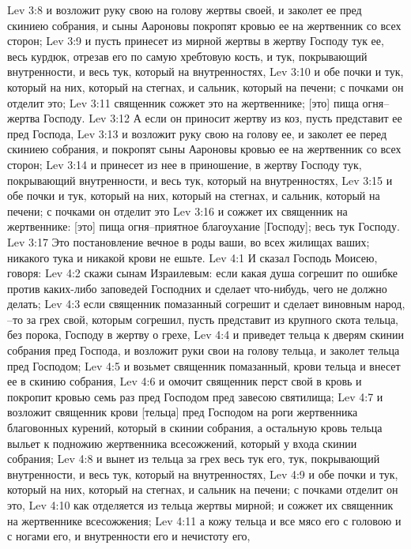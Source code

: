 Lev 3:8  и возложит руку свою на голову жертвы своей, и заколет ее пред скиниею собрания, и сыны Аароновы покропят кровью ее на жертвенник со всех сторон;
Lev 3:9  и пусть принесет из мирной жертвы в жертву Господу тук ее, весь курдюк, отрезав его по самую хребтовую кость, и тук, покрывающий внутренности, и весь тук, который на внутренностях,
Lev 3:10  и обе почки и тук, который на них, который на стегнах, и сальник, который на печени; с почками он отделит это;
Lev 3:11  священник сожжет это на жертвеннике; [это] пища огня--жертва Господу.
Lev 3:12  А если он приносит жертву из коз, пусть представит ее пред Господа,
Lev 3:13  и возложит руку свою на голову ее, и заколет ее перед скиниею собрания, и покропят сыны Аароновы кровью ее на жертвенник со всех сторон;
Lev 3:14  и принесет из нее в приношение, в жертву Господу тук, покрывающий внутренности, и весь тук, который на внутренностях,
Lev 3:15  и обе почки и тук, который на них, который на стегнах, и сальник, который на печени; с почками он отделит это
Lev 3:16  и сожжет их священник на жертвеннике: [это] пища огня--приятное благоухание [Господу]; весь тук Господу.
Lev 3:17  Это постановление вечное в роды ваши, во всех жилищах ваших; никакого тука и никакой крови не ешьте.
Lev 4:1  И сказал Господь Моисею, говоря:
Lev 4:2  скажи сынам Израилевым: если какая душа согрешит по ошибке против каких-либо заповедей Господних и сделает что-нибудь, чего не должно делать;
Lev 4:3  если священник помазанный согрешит и сделает виновным народ, --то за грех свой, которым согрешил, пусть представит из крупного скота тельца, без порока, Господу в жертву о грехе,
Lev 4:4  и приведет тельца к дверям скинии собрания пред Господа, и возложит руки свои на голову тельца, и заколет тельца пред Господом;
Lev 4:5  и возьмет священник помазанный, крови тельца и внесет ее в скинию собрания,
Lev 4:6  и омочит священник перст свой в кровь и покропит кровью семь раз пред Господом пред завесою святилища;
Lev 4:7  и возложит священник крови [тельца] пред Господом на роги жертвенника благовонных курений, который в скинии собрания, а остальную кровь тельца выльет к подножию жертвенника всесожжений, который у входа скинии собрания;
Lev 4:8  и вынет из тельца за грех весь тук его, тук, покрывающий внутренности, и весь тук, который на внутренностях,
Lev 4:9  и обе почки и тук, который на них, который на стегнах, и сальник на печени; с почками отделит он это,
Lev 4:10  как отделяется из тельца жертвы мирной; и сожжет их священник на жертвеннике всесожжения;
Lev 4:11  а кожу тельца и все мясо его с головою и с ногами его, и внутренности его и нечистоту его,
